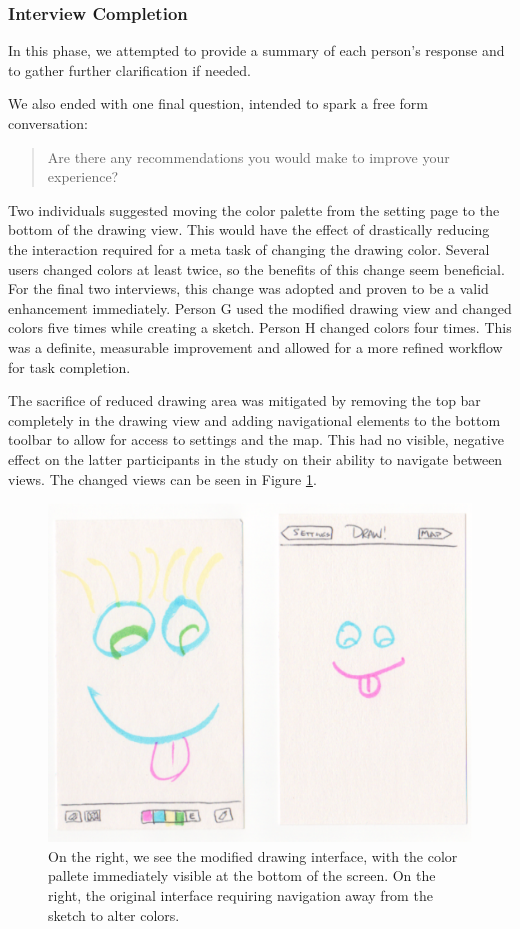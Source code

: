 \documentclass{chi2009}
\begin{document}
\subsubsection{Interview Completion}

In this phase, we attempted to provide a summary of each person's response and
to gather further clarification if needed.

We also ended with one final question, intended to spark a free form conversation:

\begin{quote}
Are there any recommendations you would make to improve your experience?
\end{quote}

Two individuals suggested moving the color palette from the setting page to the
bottom of the drawing view.  This would have the effect of drastically reducing
the interaction required for a meta task of changing the drawing color.  Several
users changed colors at least twice, so the benefits of this change seem
beneficial.  For the final two interviews, this change was adopted and proven
to be a valid enhancement immediately.  Person G used the modified drawing view
and changed colors five times while creating a sketch.  Person H changed colors
four times.  This was a definite, measurable improvement and allowed for a more
refined workflow for task completion.

The sacrifice of reduced drawing area was mitigated by removing the top bar
completely in the drawing view and adding navigational elements to the bottom
toolbar to allow for access to settings and the map.  This had no visible,
negative effect on the latter participants in the study on their ability to
navigate between views.  The changed views can be seen in Figure \ref{fig:chg}.

\begin{figure}
\centering
\includegraphics[width=.45\textwidth]{interface.pdf}
\caption{On the right, we see the modified drawing interface, with the color
pallete immediately visible at the bottom of the screen.  On the right, the
original interface requiring navigation away from the sketch to alter colors.}
\label{fig:chg}
\end{figure}
\end{document}
